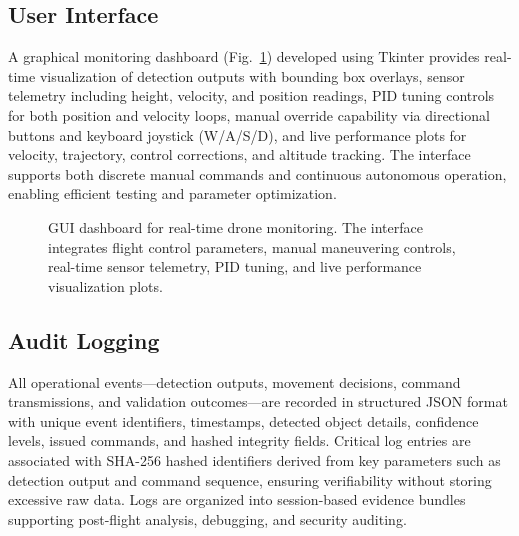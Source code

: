 \documentclass[conference]{IEEEtran}
\begin{document}
\subsection{User Interface}

A graphical monitoring dashboard (Fig.~\ref{fig:ui}) developed using Tkinter provides real-time visualization of detection outputs with bounding box overlays, sensor telemetry including height, velocity, and position readings, PID tuning controls for both position and velocity loops, manual override capability via directional buttons and keyboard joystick (W/A/S/D), and live performance plots for velocity, trajectory, control corrections, and altitude tracking. The interface supports both discrete manual commands and continuous autonomous operation, enabling efficient testing and parameter optimization.

\begin{figure}[!t]
\centering
\caption{GUI dashboard for real-time drone monitoring. The interface integrates flight control parameters, manual maneuvering controls, real-time sensor telemetry, PID tuning, and live performance visualization plots.}
\label{fig:ui}
\end{figure}

\subsection{Audit Logging}

All operational events---detection outputs, movement decisions, command transmissions, and validation outcomes---are recorded in structured JSON format with unique event identifiers, timestamps, detected object details, confidence levels, issued commands, and hashed integrity fields. Critical log entries are associated with SHA-256 hashed identifiers derived from key parameters such as detection output and command sequence, ensuring verifiability without storing excessive raw data. Logs are organized into session-based evidence bundles supporting post-flight analysis, debugging, and security auditing.
\end{document}
